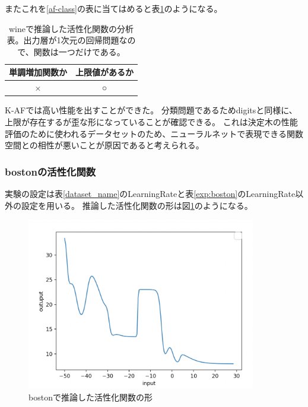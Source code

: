 またこれを\ref{af-class}の表に当てはめると表\ref{anal_wine}のようになる。
\begin{table}[htbp]
    \begin{center}
        \caption{wineで推論した活性化関数の分析表。出力層が1次元の回帰問題なので、関数は一つだけである。}
        \label{anal_wine}
        \vspace{2mm} 
        \begin{tabular}{ |c|c| }
        \hline
        単調増加関数か  & 上限値があるか   \\
        \hline
        × & ○   \\
        \hline
        \end{tabular}
    \end{center}
\end{table}

K-AFでは高い性能を出すことができた。
分類問題であるためdigitsと同様に、上限が存在するが歪な形になっていることが確認できる。
これは決定木の性能評価のために使われるデータセットのため、ニューラルネットで表現できる関数空間との相性が悪いことが原因であると考えられる。






\subsubsection{bostonの活性化関数}
\label{evo2:boston_result}
実験の設定は表\ref{dataset_name}のLearningRateと表\ref{exp:boston}のLearningRate以外の設定を用いる。
推論した活性化関数の形は図\ref{infer_boston}のようになる。
\begin{figure}[hbtp]
    \begin{center}
        \includegraphics[width=10cm]{asset/boston-0.00001.png}
            \caption{bostonで推論した活性化関数の形}
            \label{infer_boston}
    \end{center}
\end{figure}

